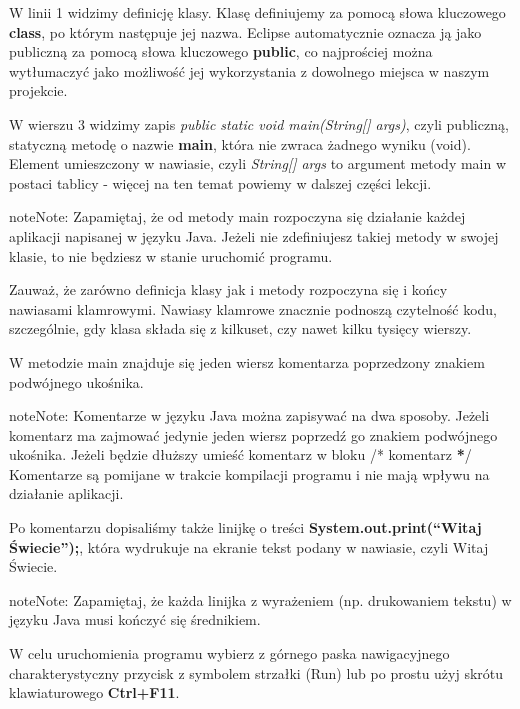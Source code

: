 \documentclass[letterpaper,10pt,english]{sphinxmanual}
\begin{document}
W linii 1 widzimy definicję klasy. Klasę definiujemy za pomocą słowa kluczowego \textbf{class}, po którym następuje jej nazwa. Eclipse automatycznie oznacza ją jako publiczną za pomocą słowa kluczowego \textbf{public}, co najprościej można wytłumaczyć jako możliwość jej wykorzystania z dowolnego miejsca w naszym projekcie.

W wierszu 3 widzimy zapis \emph{public static void main(String{[}{]} args)}, czyli publiczną, statyczną metodę o nazwie \textbf{main}, która nie zwraca żadnego wyniku (void). Element umieszczony w nawiasie, czyli \emph{String{[}{]} args} to argument metody main w postaci tablicy - więcej na ten temat powiemy w dalszej części lekcji.

\begin{notice}{note}{Note:}
Zapamiętaj, że od metody main rozpoczyna się działanie każdej aplikacji napisanej w języku Java. Jeżeli nie zdefiniujesz takiej metody w swojej klasie, to nie będziesz w stanie uruchomić programu.
\end{notice}

Zauważ, że zarówno definicja klasy jak i metody rozpoczyna się i końcy nawiasami klamrowymi. Nawiasy klamrowe znacznie podnoszą czytelność kodu, szczególnie, gdy klasa składa się z kilkuset, czy nawet kilku tysięcy wierszy.

W metodzie main znajduje się jeden wiersz komentarza poprzedzony znakiem podwójnego ukośnika.

\begin{notice}{note}{Note:}
Komentarze w języku Java można zapisywać na dwa sposoby. Jeżeli komentarz ma zajmować jedynie jeden wiersz poprzedź go znakiem podwójnego ukośnika. Jeżeli będzie dłuższy umieść komentarz w bloku /* komentarz {\color{red}\bfseries{}*}/ Komentarze są pomijane w trakcie kompilacji programu i nie mają wpływu na działanie aplikacji.
\end{notice}

Po komentarzu dopisaliśmy także linijkę o treści \textbf{System.out.print(``Witaj Świecie'');}, która wydrukuje na ekranie tekst podany w nawiasie, czyli Witaj Świecie.

\begin{notice}{note}{Note:}
Zapamiętaj, że każda linijka z wyrażeniem (np. drukowaniem tekstu) w języku Java musi kończyć się średnikiem.
\end{notice}

W celu uruchomienia programu wybierz z górnego paska nawigacyjnego charakterystyczny przycisk z symbolem strzałki (Run) lub po prostu użyj skrótu klawiaturowego \textbf{Ctrl+F11}.
\end{document}
